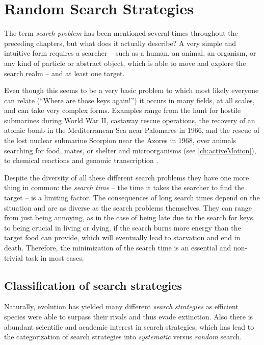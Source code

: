 \chapter{Random Search Strategies}\label{ch:randomSearchStrategies}
The term \emph{search problem} has been mentioned several times throughout the preceding chapters, but what does it actually describe? A very simple and intuitive form requires a searcher -- such as a human, an animal, an organism, or any kind of particle or abstract object, which is able to move and explore the search realm -- and at least one target.

Even though this seems to be a very basic problem to which most likely everyone can relate (``Where are those keys again!'') it occurs in many fields, at all scales, and can take very complex forms. Examples range from the hunt for hostile submarines during World War II, castaway rescue operations, the recovery of an atomic bomb in the Mediterranean Sea near Palomares in 1966, and the rescue of the lost nuclear submarine Scorpion near the Azores in 1968, over animals searching for food, mates, or shelter and microorganisms (see \autoref{ch:activeMotion}), to chemical reactions and genomic transcription \cite{benichou:2011}.

Despite the diversity of all these different search problems they have one more thing in common: the \textit{search time} -- the time it takes the searcher to find the target -- is a limiting factor. The consequences of long search times depend on the situation and are as diverse as the search problems themselves. They can range from just being annoying, as in the case of being late due to the search for keys, to being crucial in living or dying, if \eg the search burns more energy than the target food can provide, which will eventually lead to starvation and end in death. Therefore, the minimization of the search time is an essential and non-trivial task in most cases.

\section{Classification of search strategies}\label{sec:class-search-strategies}
Naturally, evolution has yielded many different \textit{search strategies} as efficient species were able to surpass their rivals and thus evade extinction. Also there is abundant scientific and academic interest in search strategies, which has lead to the categorization of search strategies into \textit{systematic} versus \textit{random} search.

